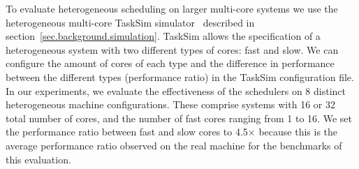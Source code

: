 
To evaluate heterogeneous scheduling on larger multi-core systems we use the heterogeneous multi-core TaskSim simulator~\cite{AbstrLevels_TACO12} described in section~\ref{sec.background.simulation}. TaskSim allows the specification of a heterogeneous system with two different types of cores: fast and slow. 
We can configure the amount of cores of each type and the difference in performance between the different types (performance ratio) in the TaskSim configuration file.
In our experiments, we evaluate the effectiveness of the schedulers on 8 distinct heterogeneous machine configurations. 
These comprise systems with 16 or 32 total number of cores, and the number of fast cores ranging from 1 to 16. 
We set the performance ratio between fast and slow cores to 4.5$\times$ because this is the average performance ratio observed on the real machine for the benchmarks of this evaluation.




%

